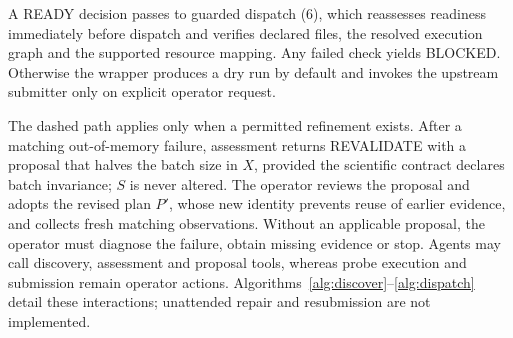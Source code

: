 \documentclass[pdflatex,sn-mathphys-num]{sn-jnl}
\theoremstyle{thmstylethree}
\begin{document}
A READY decision passes to guarded dispatch (6), which reassesses readiness immediately before dispatch and verifies declared files, the resolved execution graph and the supported resource mapping. Any failed check yields BLOCKED. Otherwise the wrapper produces a dry run by default and invokes the upstream submitter only on explicit operator request.

The dashed path applies only when a permitted refinement exists. After a matching out-of-memory failure, assessment returns REVALIDATE with a proposal that halves the batch size in $X$, provided the scientific contract declares batch invariance; $S$ is never altered. The operator reviews the proposal and adopts the revised plan $P'$, whose new identity prevents reuse of earlier evidence, and collects fresh matching observations. Without an applicable proposal, the operator must diagnose the failure, obtain missing evidence or stop. Agents may call discovery, assessment and proposal tools, whereas probe execution and submission remain operator actions. Algorithms~\ref{alg:discover}--\ref{alg:dispatch} detail these interactions; unattended repair and resubmission are not implemented.
\end{document}
